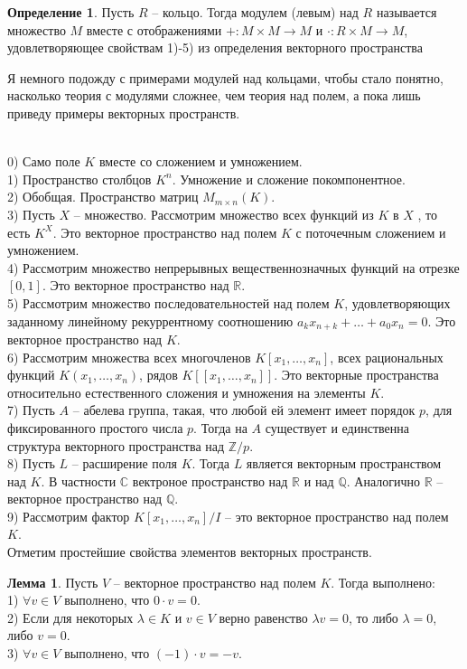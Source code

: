 \documentclass[10pt,a4paper,oneside]{book}
\theoremstyle{definition}
\newtheorem*{defn}{Определение}
\newtheorem{lem}{Лемма}
\newcommand{\mb}[1]{\mathbb{#1}}
\def\exm{\noindent {\bf Примеры:}}
\def\dfn{\begin{defn}}
\def\edfn{\end{defn}}
\def\lm{\begin{lem}}
\def\elm{\end{lem}}
\begin{document}
\dfn Пусть $R$ -- кольцо. Тогда модулем (левым) над $R$ называется множество $M$ вместе с отображениями $+\colon M\times M \to M$ и $\cdot \colon R \times M \to M$, удовлетворяющее свойствам 1)-5) из определения векторного пространства
\edfn

Я немного подожду с примерами модулей над кольцами, чтобы стало понятно, насколько теория с модулями сложнее, чем теория над полем, а пока лишь приведу примеры векторных пространств.

\exm\\
0) Само поле $K$ вместе со сложением и умножением.\\
1) Пространство столбцов $K^n$. Умножение и сложение покомпонентное.\\
2) Обобщая. Пространство матриц $M_{m\times n}(K)$.\\
3) Пусть $X$ -- множество. Рассмотрим множество всех функций  из $K$ в $X$ , то есть $K^X$. Это векторное пространство над полем $K$ с поточечным сложением и умножением.\\
4) Рассмотрим множество непрерывных вещественнозначных функций на отрезке $[0,1]$. Это векторное пространство над $\mb R$.\\
5) Рассмотрим множество последовательностей над полем $K$, удовлетворяющих заданному линейному рекуррентному соотношению $a_k x_{n+k}+\dots+a_0x_n=0$. Это векторное пространство над $K$.\\
6) Рассмотрим множества всех многочленов $K[x_1,\dots,x_n]$, всех рациональных функций $K(x_1,\dots, x_n)$, рядов $K[[x_1,\dots,x_n]]$. Это векторные пространства относительно естественного сложения и умножения на элементы $K$.\\
7) Пусть $A$ -- абелева группа, такая, что любой ей элемент имеет порядок $p$, для фиксированного простого числа $p$. Тогда на $A$ существует и единственна структура векторного пространства над $\mb Z/p$.\\
8) Пусть $L$ -- расширение поля $K$. Тогда $L$ является векторным пространством над $K$. В частности $\mb C$ вектроное пространство над $\mb R$ и над $\mb Q$. Аналогично $\mb R$ -- векторное пространство над $\mb Q$.\\
9) Рассмотрим фактор $K[x_1,\dots,x_n]/I$ -- это векторное пространство над полем $K$.\\

Отметим простейшие свойства элементов векторных пространств.
\lm Пусть $V$ -- векторное пространство над полем $K$. Тогда выполнено:\\
1) $\forall v  \in V$ выполнено, что $0\cdot v =0$.\\
2) Если для некоторых $\lambda \in K$ и $v \in V$ верно равенство $\lambda v =0$, то либо $\lambda=0$, либо $v=0$.\\
3) $\forall v  \in V$ выполнено, что $(-1)\cdot v=-v$.\\
\elm
\end{document}
